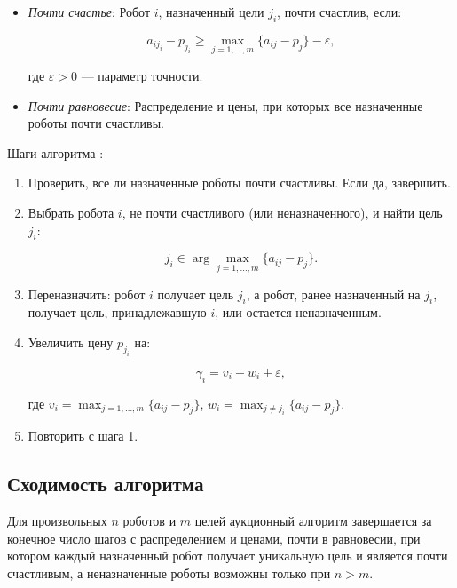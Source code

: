 \begin{itemize}
    \item \textit{Почти счастье}: Робот \( i \), назначенный цели \( j_i \), почти счастлив, если:

    \[
    a_{i j_i} - p_{j_i} \geq \max_{j=1,\ldots,m} \{a_{ij} - p_j\} - \varepsilon,
    \]

    где \( \varepsilon > 0 \) — параметр точности.
    \item \textit{Почти равновесие}: Распределение и цены, при которых все назначенные роботы почти счастливы.
\end{itemize}

Шаги алгоритма \cite{bertsekas1990}:

\begin{enumerate}
    \item Проверить, все ли назначенные роботы почти счастливы. Если да, завершить.
    \item Выбрать робота \( i \), не почти счастливого (или неназначенного), и найти цель \( j_i \):

    \[
    j_i \in \arg \max_{j=1,\ldots,m} \{a_{ij} - p_j\}.
    \]

    \item Переназначить: робот \( i \) получает цель \( j_i \), а робот, ранее назначенный на \( j_i \), получает цель, принадлежавшую \( i \), или остается неназначенным.
    \item Увеличить цену \( p_{j_i} \) на:

    \[
    \gamma_i = v_i - w_i + \varepsilon,
    \]

    где \( v_i = \max_{j=1,\ldots,m} \{a_{ij} - p_j\} \), \( w_i = \max_{j \neq j_i} \{a_{ij} - p_j\} \).
    \item Повторить с шага 1.
\end{enumerate}

\subsection{Сходимость алгоритма}
\begin{theorem}
\label{thm:auction_convergence}
Для произвольных \( n \) роботов и \( m \) целей аукционный алгоритм завершается за конечное число шагов с распределением и ценами, почти в равновесии, при котором каждый назначенный робот получает уникальную цель и является почти счастливым, а неназначенные роботы возможны только при \( n > m \).
\end{theorem}

